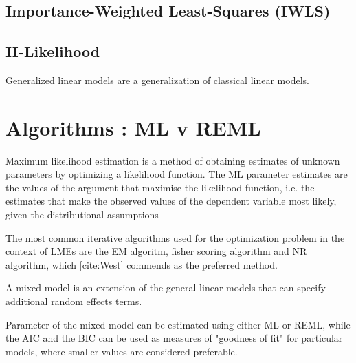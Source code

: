 \documentclass[12pt, a4paper]{report}
\theoremstyle{plain}
\theoremstyle{definition}
\theoremstyle{remark}
\begin{document}
\subsection{Importance-Weighted Least-Squares (IWLS)}  %


\subsection{H-Likelihood}





	
	Generalized linear models are a generalization of classical linear  models.
	

	\section{Algorithms : ML v REML}
	Maximum likelihood estimation is a method of obtaining estimates of unknown parameters by optimizing a likelihood function. The ML
	parameter estimates are the values of the argument that maximise the likelihood function, i.e. the estimates that make the observed
	values of the dependent variable most likely, given the distributional assumptions
	
	The most common iterative algorithms used for the optimization
	problem in the context of LMEs are the EM algoritm, fisher scoring
	algorithm and NR algorithm, which [cite:West] commends as the
	preferred method.
	
	A mixed model is an extension of the general linear models that
	can specify additional random effects terms.
	
	Parameter of the mixed model can be estimated using either ML or
	REML, while the AIC and the BIC can be used as measures of
	"goodness of fit" for particular models, where smaller values are
	considered preferable.
	
	
\end{document}
